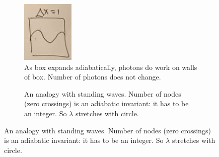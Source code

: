 \documentclass[]{article}
\begin{document}
\begin{figure}[H]
	\caption{Unit box with photons: $\lambda$ increases as box expands adiabatically }\label{fig:unit:box}
	\begin{center}
			\begin{subfigure}[t]{0.45\textwidth}
				\begin{center}
					\caption{As box expands adiabatically, photons do work on walls of box. Number of photons does not change.}
					\includegraphics[width=\textwidth]{cosmo-2-unit-box}
				\end{center}
			\end{subfigure}
			\;
			\begin{subfigure}[t]{0.45\textwidth}
				\begin{center}
					\caption{An analogy with standing waves. Number of nodes (zero crossings) is an adiabatic invariant:  it has to be an integer. So $\lambda$ stretches with circle.}

\end{center}
\end{subfigure}
\end{center}
\end{figure}
\end{document}
